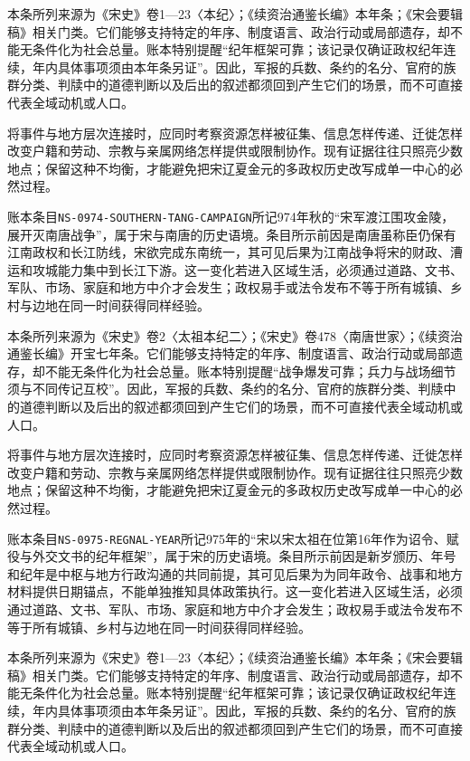 本条所列来源为《宋史》卷1—23〈本纪〉；《续资治通鉴长编》本年条；《宋会要辑稿》相关门类。它们能够支持特定的年序、制度语言、政治行动或局部遗存，却不能无条件化为社会总量。账本特别提醒“纪年框架可靠；该记录仅确证政权纪年连续，年内具体事项须由本年条另证”。因此，军报的兵数、条约的名分、官府的族群分类、判牍中的道德判断以及后出的叙述都须回到产生它们的场景，而不可直接代表全域动机或人口。

将事件与地方层次连接时，应同时考察资源怎样被征集、信息怎样传递、迁徙怎样改变户籍和劳动、宗教与亲属网络怎样提供或限制协作。现有证据往往只照亮少数地点；保留这种不均衡，才能避免把宋辽夏金元的多政权历史改写成单一中心的必然过程。

账本条目\texttt{NS-0974-SOUTHERN-TANG-CAMPAIGN}所记974年秋的“宋军渡江围攻金陵，展开灭南唐战争”，属于宋与南唐的历史语境。条目所示前因是南唐虽称臣仍保有江南政权和长江防线，宋欲完成东南统一，其可见后果为江南战争将宋的财政、漕运和攻城能力集中到长江下游。这一变化若进入区域生活，必须通过道路、文书、军队、市场、家庭和地方中介才会发生；政权易手或法令发布不等于所有城镇、乡村与边地在同一时间获得同样经验。

本条所列来源为《宋史》卷2〈太祖本纪二〉；《宋史》卷478〈南唐世家〉；《续资治通鉴长编》开宝七年条。它们能够支持特定的年序、制度语言、政治行动或局部遗存，却不能无条件化为社会总量。账本特别提醒“战争爆发可靠；兵力与战场细节须与不同传记互校”。因此，军报的兵数、条约的名分、官府的族群分类、判牍中的道德判断以及后出的叙述都须回到产生它们的场景，而不可直接代表全域动机或人口。

将事件与地方层次连接时，应同时考察资源怎样被征集、信息怎样传递、迁徙怎样改变户籍和劳动、宗教与亲属网络怎样提供或限制协作。现有证据往往只照亮少数地点；保留这种不均衡，才能避免把宋辽夏金元的多政权历史改写成单一中心的必然过程。

账本条目\texttt{NS-0975-REGNAL-YEAR}所记975年的“宋以宋太祖在位第16年作为诏令、赋役与外交文书的纪年框架”，属于宋的历史语境。条目所示前因是新岁颁历、年号和纪年是中枢与地方行政沟通的共同前提，其可见后果为为同年政令、战事和地方材料提供日期锚点，不能单独推知具体政策执行。这一变化若进入区域生活，必须通过道路、文书、军队、市场、家庭和地方中介才会发生；政权易手或法令发布不等于所有城镇、乡村与边地在同一时间获得同样经验。

本条所列来源为《宋史》卷1—23〈本纪〉；《续资治通鉴长编》本年条；《宋会要辑稿》相关门类。它们能够支持特定的年序、制度语言、政治行动或局部遗存，却不能无条件化为社会总量。账本特别提醒“纪年框架可靠；该记录仅确证政权纪年连续，年内具体事项须由本年条另证”。因此，军报的兵数、条约的名分、官府的族群分类、判牍中的道德判断以及后出的叙述都须回到产生它们的场景，而不可直接代表全域动机或人口。

